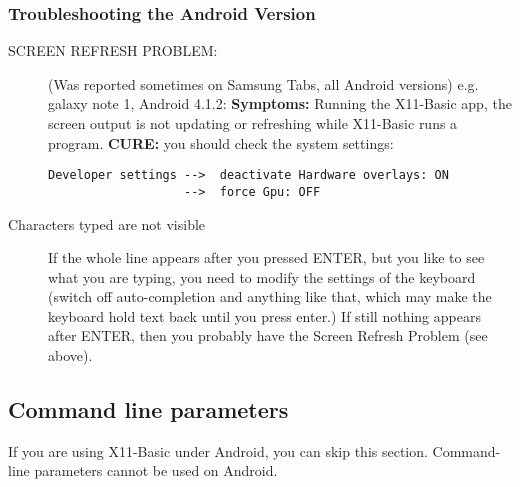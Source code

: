 \subsubsection*{Troubleshooting the Android Version}
\begin{description}

\item[SCREEN REFRESH PROBLEM:] (Was reported sometimes on Samsung Tabs, 
all Android versions) e.g. galaxy note 1, Android 4.1.2:
{\bf Symptoms:} Running the X11-Basic app, the screen output is not updating or 
refreshing while X11-Basic runs a program. 
{\bf CURE:} you should check the system settings:
\begin{verbatim}
Developer settings -->  deactivate Hardware overlays: ON 
                   -->  force Gpu: OFF 
\end{verbatim}

\item[Characters typed are not visible] If the whole line appears  after you
pressed ENTER, but you like to see what you are typing, you  need to modify the
settings of the keyboard (switch off auto-completion  and anything like that,
which may make the keyboard hold text back until you press enter.) If still 
nothing appears after ENTER, then you probably have the Screen Refresh Problem 
(see above).

\end{description}

%

\subsection{Command line parameters}

If you are using X11-Basic under Android, you can skip this section. 
Command-line parameters cannot be used on Android.

